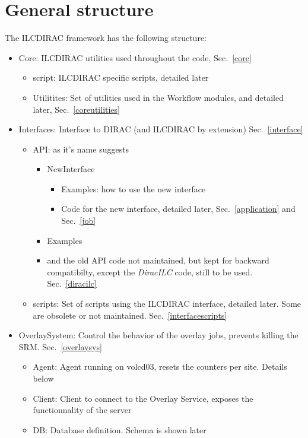 \documentclass[a4paper,12pt]{article}
\begin{document}
\section{General structure}
The ILCDIRAC framework has the following structure:
\begin{itemize}
  \item Core: ILCDIRAC utilities used throughout the code, Sec.~\ref{core}
  \begin{itemize}
    \item script: ILCDIRAC specific scripts, detailed later
    \item Utilitites: Set of utilities used in the Workflow modules, and
    detailed later, Sec.~\ref{coreutilities}
  \end{itemize}
  \item Interfaces: Interface to DIRAC (and ILCDIRAC by
  extension) Sec.~\ref{interface}
  \begin{itemize}
    \item API: as it's name suggests
    \begin{itemize}
      \item NewInterface
      \begin{itemize}
        \item Examples: how to use the new interface
        \item Code for the new interface, detailed later, Sec.~\ref{application}
        and Sec.~\ref{job}
      \end{itemize}
      \item Examples
      \item and the old API code not maintained, but kept for backward
      compatibilty, except the \emph{DiracILC} code, still to be used.
      Sec.~\ref{diracilc}
    \end{itemize}
    \item scripts: Set of scripts using the ILCDIRAC interface, detailed later.
    Some are obsolete or not maintained. Sec.~\ref{interfacescripts}
  \end{itemize}
  \item OverlaySystem: Control the behavior of the overlay jobs, prevents
  killing the SRM. Sec.~\ref{overlaysys}
  \begin{itemize}
    \item Agent: Agent running on volcd03, resets the counters per site. Details
    below
    \item Client: Client to connect to the Overlay Service, exposes the
    functionnality of the server
    \item DB: Database definition. Schema is shown later

\end{itemize}
\end{itemize}
\end{document}
